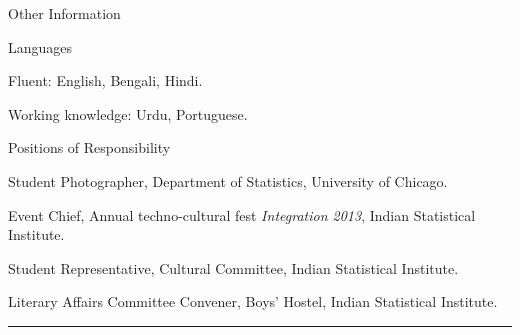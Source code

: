 \documentclass{resume} %
\begin{document}
\begin{rSection}{Other Information}
\begin{rSubsection}{Languages}{}{}{} 
\item Fluent: English, Bengali, Hindi.
\item Working knowledge: Urdu, Portuguese.
\end{rSubsection}


\begin{rSubsection}{Positions of Responsibility}{}{}{} 
\item Student Photographer, Department of Statistics, University of Chicago.
\item Event Chief, Annual techno-cultural fest {\it Integration 2013}, Indian Statistical Institute.
\item Student Representative, Cultural Committee, Indian Statistical Institute.
\item Literary Affairs Committee Convener, Boys' Hostel, Indian Statistical Institute.
\end{rSubsection}


\end{rSection}

\rule{\textwidth}{0.4pt}
\end{document}
